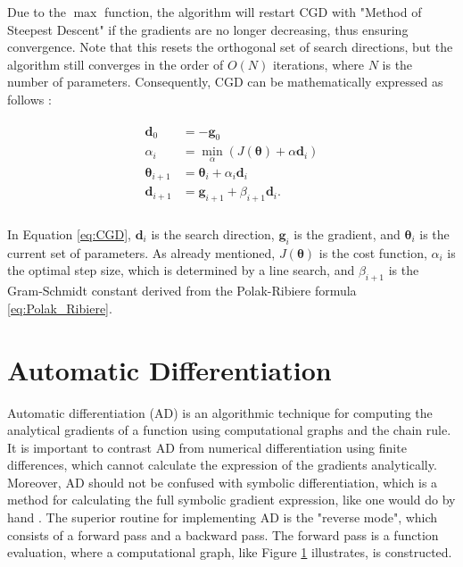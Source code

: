 Due to the $\max$ function, the algorithm will restart CGD with "Method of Steepest Descent" if the gradients are no longer decreasing, thus ensuring convergence.
Note that this resets the orthogonal set of search directions, but the algorithm still converges in the order of $O(N)$ iterations, where $N$ is the number of parameters.
Consequently, CGD can be mathematically expressed as follows \cite{shewchuk1994introduction}:


\begin{align}\label{eq:CGD}
    \begin{split}
        \bm{d}_{0}        & = - \bm{g}_{0}                                                    \\
        \alpha_{i}        & = \min_{\alpha} \left( J(\bm{\theta}) + \alpha \bm{d}_{i} \right) \\
        \bm{\theta}_{i+1} & = \bm{\theta}_{i} + \alpha_{i} \bm{d}_{i}                         \\
        \bm{d}_{i+1}      & = \bm{g}_{i+1} + \beta_{i+1} \bm{d}_{i}.                          \\
    \end{split}
\end{align}

In Equation \eqref{eq:CGD}, $\bm{d}_{i}$ is the search direction, $\bm{g}_{i}$ is the gradient, and $\bm{\theta}_{i}$ is the current set of parameters.
As already mentioned, $J(\bm{\theta})$ is the cost function, $\alpha_{i}$ is the optimal step size, which is determined by a line search, and $\beta_{i+1}$ is the Gram-Schmidt constant derived from the Polak-Ribiere formula \eqref{eq:Polak_Ribiere}.




\section{Automatic Differentiation}
\noindent
Automatic differentiation (AD) is an algorithmic technique for computing the analytical gradients of a function using computational graphs and the chain rule.
It is important to contrast AD from numerical differentiation using finite differences, which cannot calculate the expression of the gradients analytically.
Moreover, AD should not be confused with symbolic differentiation, which is a method for calculating the full symbolic gradient expression, like one would do by hand \cite{baydin2018automatic}.
The superior routine for implementing AD is the "reverse mode", which consists of a forward pass and a backward pass.
The forward pass is a function evaluation, where a computational graph, like Figure \ref{} illustrates, is constructed.

